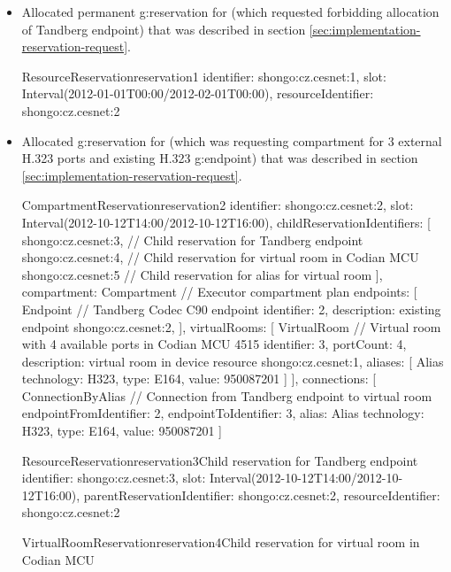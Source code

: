\begin{itemize}
\item Allocated permanent \gls{g:reservation} for \hyperref[oc:request1]{} (which requested forbidding allocation of Tandberg endpoint) that was described in section \ref{sec:implementation-reservation-request}.
\begin{ObjectCode}{ResourceReservation}{reservation1}{}
identifier: shongo:cz.cesnet:1,
slot: Interval(2012-01-01T00:00/2012-02-01T00:00),
resourceIdentifier: shongo:cz.cesnet:2
\end{ObjectCode}

\item Allocated \gls{g:reservation} for \hyperref[oc:request2]{} (which was requesting compartment for 3 external H.323 ports and existing H.323 \gls{g:endpoint}) that was described in section \ref{sec:implementation-reservation-request}.
\begin{ObjectCode}{CompartmentReservation}{reservation2}{}
identifier: shongo:cz.cesnet:2,
slot: Interval(2012-10-12T14:00/2012-10-12T16:00),
childReservationIdentifiers: [
  shongo:cz.cesnet:3, // Child reservation for Tandberg endpoint 
  shongo:cz.cesnet:4, // Child reservation for virtual room in Codian MCU
  shongo:cz.cesnet:5  // Child reservation for alias for virtual room
],
compartment: Compartment { // Executor compartment plan
  endpoints: [
    Endpoint { // Tandberg Codec C90 endpoint
      identifier: 2,
      description: existing endpoint shongo:cz.cesnet:2,      
    }
  ],
  virtualRooms: [
    VirtualRoom { // Virtual room with 4 available ports in Codian MCU 4515
      identifier: 3,
      portCount: 4,
      description: virtual room in device resource shongo:cz.cesnet:1,      
      aliases: [
        Alias { technology: H323, type: E164, value: 950087201 }
      ]
    }
  ],
  connections: [
    ConnectionByAlias { // Connection from Tandberg endpoint to virtual room
      endpointFromIdentifier: 2, 
      endpointToIdentifier: 3,
      alias: Alias { technology: H323, type: E164, value: 950087201 }
    }
  ]
}
\end{ObjectCode}
\begin{ObjectCode}{ResourceReservation}{reservation3}{Child reservation for Tandberg endpoint}
identifier: shongo:cz.cesnet:3,
slot: Interval(2012-10-12T14:00/2012-10-12T16:00),
parentReservationIdentifier: shongo:cz.cesnet:2,
resourceIdentifier: shongo:cz.cesnet:2
\end{ObjectCode}
\begin{ObjectCode}{VirtualRoomReservation}{reservation4}{Child reservation for virtual room in Codian MCU}

\end{ObjectCode}
\end{itemize}
